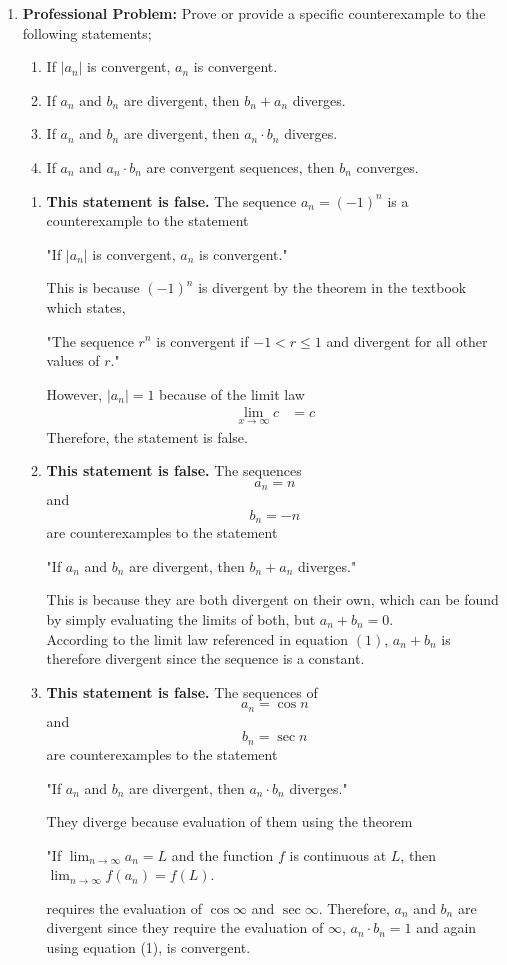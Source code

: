 \documentclass{article}
\begin{document}
\begin{enumerate}[label=\textbf{(9.\arabic*)}]
\newpage


\item \textbf{Professional Problem:} Prove or provide a specific counterexample to the following statements;
\begin{enumerate}
\item If ${|a_n|}$ is convergent, ${a_n}$ is convergent.
\item If ${a_n}$ and ${b_n}$ are divergent, then ${b_n+a_n}$ diverges.
\item If ${a_n}$ and ${b_n}$ are divergent, then ${a_n\cdot b_n}$ diverges.
\item If ${a_n}$ and ${a_n\cdot b_n}$ are convergent sequences, then ${b_n}$ converges.
\end{enumerate}

\begin{enumerate}
\item \textbf{This statement is false.} The sequence $a_n=(-1)^n$ is a counterexample to the statement
\begin{center}
"If ${|a_n|}$ is convergent, ${a_n}$ is convergent."
\end{center}
This is because $(-1)^n$ is divergent by the theorem in the textbook which states,
\begin{center}
"The sequence ${r^n}$ is convergent if $-1<r\le1$ and divergent for all other values of $r$."
\end{center}
However, ${|a_n|}=1$ because of the limit law 
\begin{align}
\lim_{x\to\infty} c &= c
\end{align}
Therefore, the statement is false.

\item \textbf{This statement is false.} The sequences \[a_n=n\] and \[b_n=-n\] are counterexamples to the statement 
\begin{center}
"If ${a_n}$ and ${b_n}$ are divergent, then ${b_n+a_n}$ diverges."
\end{center}
This is because they are both divergent on their own, which can be found by simply evaluating the limits of both, but $a_n+b_n=0$. \\
According to the limit law referenced in equation $(1)$, $a_n+b_n$ is therefore divergent since the sequence is a constant.

\item \textbf{This statement is false.} The sequences of \[a_n=\cos n\] and \[b_n=\sec n\] are counterexamples to the statement
\begin{center}
"If ${a_n}$ and ${b_n}$ are divergent, then ${a_n\cdot b_n}$ diverges."
\end{center} 
They diverge because evaluation of them using the theorem
\begin{center}
"If $\lim_{n\to\infty} a_n = L$ and the function $f$ is continuous at $L$, then $\lim_{n\to\infty}f(a_n)=f(L)$.
\end{center}
requires the evaluation of $\cos\infty$ and $\sec\infty$. Therefore, $a_n$ and $b_n$ are divergent since they require the evaluation of $\infty$, $a_n\cdot b_n=1$ and again using equation (1), is convergent.


\end{enumerate}
\end{enumerate}
\end{document}
